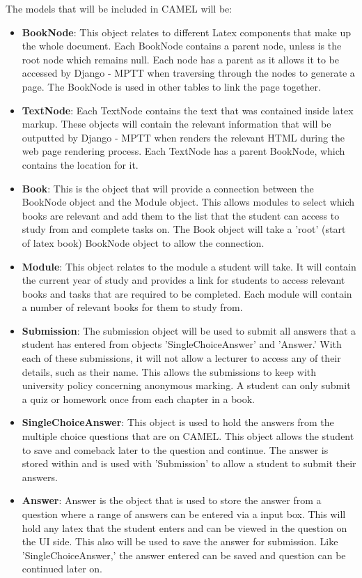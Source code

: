 	The models that will be included in CAMEL will be:
	\begin{itemize}
		\item \textbf{BookNode}: This object relates to different Latex components that make up the whole document. Each BookNode contains a parent node, unless is the root node which remains null. Each node has a parent as it allows it to be accessed by Django - MPTT when traversing through the nodes to generate a page. The BookNode is used in other tables to link the page together.     
		
		\item \textbf{TextNode}: Each TextNode contains the text that was contained inside latex markup. These objects will contain the relevant information that will be outputted by Django - MPTT when renders the relevant HTML during the web page rendering process. Each TextNode has a parent BookNode, which contains the location for it.  
		
		\item \textbf{Book}: This is the object that will provide a connection between the BookNode object and the Module object. This allows modules to select which books are relevant and add them to the list that the student can access to study from and complete tasks on. The Book object will take a 'root' (start of latex book) BookNode object to allow the connection. 
		
		\item \textbf{Module}: This object relates to the module a student will take. It will contain the current year of study and provides a link for students to access relevant books and tasks that are required to be completed. Each module will contain a number of relevant books for them to study from.
		
		\item \textbf{Submission}: The submission object will be used to submit all answers that a student has entered from objects 'SingleChoiceAnswer' and 'Answer.' With each of these submissions, it will not allow a lecturer to access any of their details, such as their name. This allows the submissions to keep with university policy concerning anonymous marking. A student can only submit a quiz or homework once from each chapter in a book.   
		
		\item \textbf{SingleChoiceAnswer}: This object is used to hold the answers from the multiple choice questions that are on CAMEL. This object allows the student to save and comeback later to the question and continue. The answer is stored within and is used with 'Submission' to allow a student to submit their answers. 
		
		\item \textbf{Answer}: Answer is the object that is used to store the answer from a question where a range of answers can be entered via a input box. This will hold any latex that the student enters and can be viewed in the question on the UI side. This also will be used to save the answer for submission. Like 'SingleChoiceAnswer,' the answer entered can be saved and question can be continued later on. 
	\end{itemize}
	
